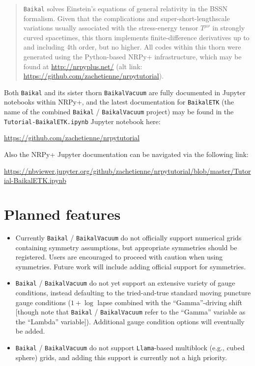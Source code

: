 \newenvironment{packed_enumerate}{
\begin{enumerate}
  \setlength{\itemsep}{0.0pt}
  \setlength{\parskip}{0.0pt}
  \setlength{\parsep}{ 0.0pt}
}{\end{enumerate}}

\begin{abstract}
\texttt{Baikal} solves Einstein's equations of general
relativity in the BSSN formalism. Given that the complications and
super-short-lengthscale variations usually associated with the
stress-energy tensor $T^{\mu\nu}$ in strongly curved spacetimes, this
thorn implements finite-difference derivatives up to and including 4th
order, but no higher. All codes 
within this thorn were generated using the Python-based NRPy+
infrastructure, which may be found at \url{http://nrpyplus.net/} (alt
link: \url{https://github.com/zachetienne/nrpytutorial}).
\end{abstract}

Both \texttt{Baikal} and its sister thorn \texttt{BaikalVacuum} are
fully documented in Jupyter notebooks within NRPy+, and
the latest documentation for \texttt{BaikalETK} (the name of the
combined \texttt{Baikal} / \texttt{BaikalVacuum} project) may be found
in the \texttt{Tutorial-BaikalETK.ipynb} Jupyter notebook here:

\url{https://github.com/zachetienne/nrpytutorial}

Also the NRPy+ Jupyter documentation can be navigated via the
following link:

\url{https://nbviewer.jupyter.org/github/zachetienne/nrpytutorial/blob/master/Tutorial-BaikalETK.ipynb}

\section{Planned features}

\begin{itemize}
\item Currently \texttt{Baikal} / \texttt{BaikalVacuum} do not officially
support numerical grids containing symmetry assumptions, but
appropriate symmetries should be registered. Users are encouraged to
proceed with caution when using symmetries. Future work will include adding
official support for symmetries.
\item \texttt{Baikal} / \texttt{BaikalVacuum} do not yet support an
  extensive variety of gauge conditions, instead defaulting to the
  tried-and-true standard moving puncture gauge conditions ($1+\log$
  lapse combined with the ``Gamma''-driving shift [though note that
    \texttt{Baikal} / \texttt{BaikalVacuum} refer to the  ``Gamma''
    variable as the ``Lambda'' variable]). Additional gauge condition
  options will eventually be added.
\item \texttt{Baikal} / \texttt{BaikalVacuum} do not support
  \texttt{Llama}-based multiblock (e.g., cubed sphere) grids, and
  adding this support is currently not a high priority.
\end{itemize}


